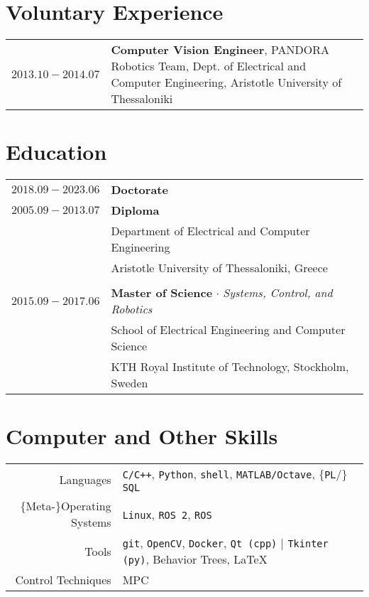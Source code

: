 \documentclass[a4paper,10pt,twoside]{article}
\begin{document}
\section{Voluntary Experience}

\begin{tabular}{rp{12cm}}
$2013.10 - 2014.07$ & \textbf{Computer Vision Engineer}, PANDORA Robotics Team,
Dept. of Electrical and Computer Engineering, Aristotle University of Thessaloniki
\end{tabular}



\section{Education}

\begin{tabular}{rp{12cm}}
$2018.09 - 2023.06$ & \textbf{Doctorate} \\
$2005.09 - 2013.07$ & \textbf{Diploma} \\
                    & Department of Electrical and Computer Engineering\\
                    & Aristotle University of Thessaloniki, Greece \\
&\\
$2015.09 - 2017.06$ & \textbf{Master of Science} $\cdot$ \textit{Systems, Control, and Robotics}\\
                    & School of Electrical Engineering and Computer Science\\
                    & KTH Royal Institute of Technology, Stockholm, Sweden\\
\end{tabular}


\section{Computer and Other Skills}

\begin{tabular}{rp{12cm}}
Languages & \texttt{C/C++}, \texttt{Python}, \texttt{shell}, \texttt{MATLAB/Octave}, $\{$\texttt{PL}/$\}$\texttt{SQL}\\
$\{$Meta-$\}$Operating Systems & \texttt{Linux}, \texttt{ROS 2}, \texttt{ROS} \\
Tools & \texttt{git}, \texttt{OpenCV}, \texttt{Docker}, \texttt{Qt (cpp)} | \texttt{Tkinter (py)}, Behavior Trees, \LaTeX \\
Control Techniques & MPC \\
\end{tabular}
\end{document}
